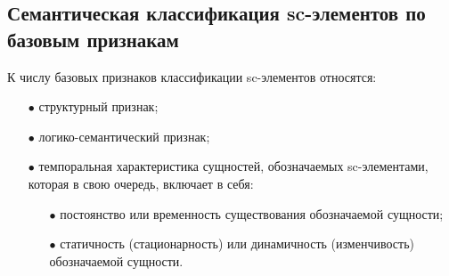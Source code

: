 \subsection{Семантическая классификация sc-элементов по базовым признакам}
К числу базовых признаков классификации sc-элементов относятся:
\begin{itemize}
	\item[$\bullet$] структурный признак;
	\item[$\bullet$] логико-семантический признак;
	\item[$\bullet$] темпоральная характеристика сущностей, обозначаемых sc-элементами, которая в свою очередь, включает в себя:
	\begin{itemize}
		\item[$\bullet$] постоянство или временность существования обозначаемой сущности;
		\item[$\bullet$] статичность (стационарность) или динамичность (изменчивость) обозначаемой сущности.
	\end{itemize}
\end{itemize}

